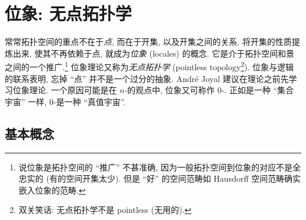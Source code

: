 \chapter{位象: 无点拓扑学}


\minitoc

常常拓扑空间的重点不在于\emph{点}, 而在于开集, 以及开集之间的关系.
将开集的性质提炼出来, 使其不再依赖于点, 就成为\emph{位象} (locales) 的概念. 它是介于拓扑空间和景之间的一个推广.\footnote{说位象是拓扑空间的 ``推广'' 不甚准确, 因为一般拓扑空间到位象的对应不是全忠实的 (有的空间开集太少). 但是 ``好'' 的空间范畴如 Hausdorff 空间范畴确实嵌入位象的范畴.}
位象理论又称为\emph{无点拓扑学} (pointless topology\footnote{双关笑话: 无点拓扑学不是 pointless (无用的).}). 位象与逻辑的联系表明, 忘掉 ``点'' 并不是一个过分的抽象. Andr\'e Joyal \cite{Joyal-Crash-Course} 建议在\topos{}理论之前先学习位象理论. 一个原因可能是在 $n$-\topos{}的观点中, 位象又可称作 $0$-\topos{}. 正如\topos{}是一种 ``集合宇宙'' 一样, $0$-\topos{}是一种 ``真值宇宙''. %

\newcommand{\fm}{位格}

\section{基本概念}

